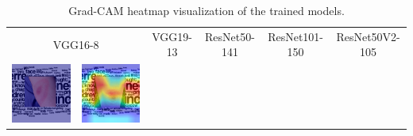 \begin{landscape}
	\begin{table}[]
		\centering
		\caption {Grad-CAM heatmap visualization of the trained models.}
		\label{tab:gradcam}
		\begin{tabular}{@{}c c c c c c c c c c@{}}
			\toprule
			\multicolumn{2}{c}{VGG16-8} & \multicolumn{2}{c}{VGG19-13} & \multicolumn{2}{c}{ResNet50-141} & \multicolumn{2}{c}{ResNet101-150} & \multicolumn{2}{c}{ResNet50V2-105}\\
			\includegraphics[width=.12\textheight ,keepaspectratio]{images/pretraining/gradcam/3/VGG16CombinedGradCam.png} &
			\includegraphics[width=.12\textheight ,keepaspectratio]{images/pretraining/gradcam/9/VGG16CombinedGradCam.png} &

\end{tabular}
\end{table}
\end{landscape}
